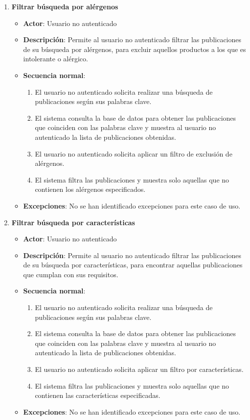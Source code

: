 \begin{enumerate}[label=UC-\protect\twodigits{\arabic*}:, align=left, leftmargin=*]
\item \textbf{Filtrar búsqueda por alérgenos}
\begin{itemize}
\item \textbf{Actor}: Usuario no autenticado
\item \textbf{Descripción}: Permite al usuario no autenticado filtrar las publicaciones de su búsqueda por alérgenos, para excluir aquellos productos a los que es intolerante o alérgico.
\item \textbf{Secuencia normal}:
\begin{enumerate}[label={\arabic*}:]
\item El usuario no autenticado solicita realizar una búsqueda de publicaciones según sus palabras clave.
\item El sistema consulta la base de datos para obtener las publicaciones que coinciden con las palabras clave y muestra al usuario no autenticado la lista de publicaciones obtenidas.
\item El usuario no autenticado solicita aplicar un filtro de exclusión de alérgenos.
\item El sistema filtra las publicaciones y muestra solo aquellas que no contienen los alérgenos especificados.
\end{enumerate}
\item \textbf{Excepciones}: No se han identificado excepciones para este caso de uso.
\end{itemize}

\item \textbf{Filtrar búsqueda por características}
\begin{itemize}
\item \textbf{Actor}: Usuario no autenticado
\item \textbf{Descripción}: Permite al usuario no autenticado filtrar las publicaciones de su búsqueda por características, para encontrar aquellas publicaciones que cumplan con sus requisitos.
\item \textbf{Secuencia normal}:
\begin{enumerate}[label={\arabic*}:]
  \item El usuario no autenticado solicita realizar una búsqueda de publicaciones según sus palabras clave.
  \item El sistema consulta la base de datos para obtener las publicaciones que coinciden con las palabras clave y muestra al usuario no autenticado la lista de publicaciones obtenidas.
  \item El usuario no autenticado solicita aplicar un filtro por características.
  \item El sistema filtra las publicaciones y muestra solo aquellas que no contienen las características especificadas.
  \end{enumerate}
\item \textbf{Excepciones}: No se han identificado excepciones para este caso de uso.
\end{itemize}


\end{enumerate}
